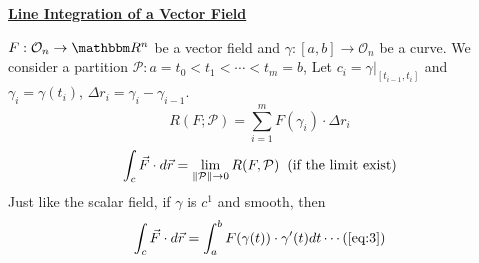 \documentclass[Analysis-3]{subfiles}
\begin{document}
\begin{center}
    \large \underline{\textbf{Line Integration of a Vector Field} }
\end{center}

$F:\mathcal{O}_n \to \R^n$ be a vector field and $\gamma:[a,b] \to \mathcal{O}_n$ be a curve. We consider a partition $\mathcal{P}: a =t_0<t_1<\cdots < t_m=b$, Let $c_i = \gamma|_{[t_{i-1},t_i]}$ and $\gamma_i = \gamma(t_i)$, $\Delta r_i = \gamma_{i} - \gamma_{i-1}$.
\[R(F;\mathcal{P})= \sum_{i=1}^m F(\gamma_i)\cdot \Delta r_i\]
\[\int_c \vec{F}\cdot d\vec{r} = \lim_{\norm{\mathcal{P}}\to 0} R(F,\mathcal{P}) \hspace{0.2cm}(\text{if the limit exist})\]
Just like the scalar field, if $\gamma$ is $c^1$ and smooth, then
\[\int_c \vec{F}\cdot d\vec{r} = \int_a^b F(\gamma(t))\cdot \gamma'(t) dt \label{eq:3} \cdots (\ref{eq:3})\]
\end{document}
